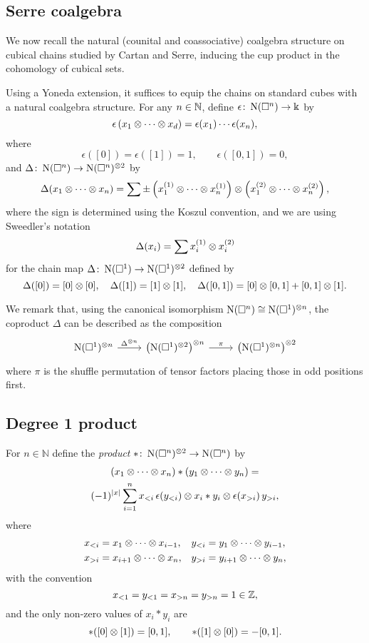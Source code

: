 \subsection{Serre coalgebra} \label{ss:serre coalgebra}

We now recall the natural (counital and coassociative) coalgebra structure on cubical chains studied by Cartan and Serre, inducing the cup product in the cohomology of cubical sets.

Using a Yoneda extension, it suffices to equip the chains on standard cubes with a natural coalgebra structure.
For any $n \in \mathbb{N}$, define $\epsilon \colon \operatorname{N}(\square^n) \to \Bbbk$ by
\[
\epsilon \left( x_1 \otimes \dotsb \otimes x_d \right) = \epsilon(x_1) \dotsm \epsilon(x_n),
\]
where
\[
\epsilon([0]) = \epsilon([1]) = 1, \qquad \epsilon([0, 1]) = 0,
\]
and $\Delta \colon \operatorname{N}(\square^n) \to \operatorname{N}(\square^n)^{\otimes 2}$ by
\[
\Delta (x_1 \otimes \dotsb \otimes x_n) =
\sum \pm \left( x_1^{(1)} \otimes \dotsb \otimes x_n^{(1)} \right) \otimes
\left( x_1^{(2)} \otimes \dotsb \otimes x_n^{(2)} \right),
\]
where the sign is determined using the Koszul convention, and we are using Sweedler's notation
\[
\Delta(x_i) = \sum x_i^{(1)} \otimes x_i^{(2)}
\]
for the chain map $\Delta \colon \operatorname{N}(\square^1) \to \operatorname{N}(\square^1)^{\otimes 2}$ defined by
\[
\Delta([0]) = [0] \otimes [0], \quad \Delta([1]) = [1] \otimes [1], \quad \Delta([0,1]) = [0] \otimes [0,1] + [0,1] \otimes [1].
\]

We remark that, using the canonical isomorphism $\operatorname{N}(\square^n) \cong \operatorname{N}(\square^1)^{\otimes n}$, the coproduct $\Delta$ can be described as the composition
\[
\begin{tikzcd}
\chains(\cube^1)^{\ot n} \arrow[r, "\Delta^{\ot n}"] & \left( \chains(\cube^1)^{\ot 2} \right)^{\ot n} \arrow[r, "\pi"] & \left( \chains(\cube^1)^{\ot n} \right)^{\ot 2}
\end{tikzcd}
\]
where $\pi$ is the shuffle permutation of tensor factors placing those in odd positions first.

\subsection{Degree 1 product}

For $n \in \mathbb{N}$ define the \textit{product} $\ast  \colon \operatorname{N}(\square^n)^{\otimes 2} \to \operatorname{N}(\square^n)$ by
\begin{multline*}
(x_1 \otimes \dotsb \otimes x_n) \ast (y_1 \otimes \dotsb \otimes y_n) = \\
(-1)^{|x|} \sum_{i=1}^n x_{<i}\, \epsilon(y_{<i}) \otimes x_i \ast y_i \otimes \epsilon(x_{>i}) \, y_{>i},
\end{multline*}
where
\begin{align*}
x_{<i} & = x_1 \otimes \dotsb \otimes x_{i-1}, &
y_{<i} & = y_1 \otimes \dotsb \otimes y_{i-1}, \\
x_{>i} & = x_{i+1} \otimes \dotsb \otimes x_n, &
y_{>i} & = y_{i+1} \otimes \dotsb \otimes y_n,
\end{align*}
with the convention
\[
x_{<1} = y_{<1} = x_{>n} = y_{>n} = 1 \in \mathbb{Z},
\]
and the only non-zero values of $x_i \ast y_i$ are
\[
\ast([0] \otimes [1]) = [0, 1], \qquad  \ast([1] \otimes [0]) = -[0, 1].
\]

